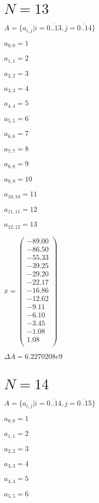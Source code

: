 \documentclass[a4paper,12pt]{article}
\begin{document}
\section{ $N = 13$ }
$A = \{ a _{ i, j } | i = \overline { 0..13 }, j = \overline { 0..14 } \}$

$a _{ 0, 0 } = 1$

$a _{ 1, 1 } = 2$

$a _{ 2, 2 } = 3$

$a _{ 3, 3 } = 4$

$a _{ 4, 4 } = 5$

$a _{ 5, 5 } = 6$

$a _{ 6, 6 } = 7$

$a _{ 7, 7 } = 8$

$a _{ 8, 8 } = 9$

$a _{ 9, 9 } = 10$

$a _{ 10, 10 } = 11$

$a _{ 11, 11 } = 12$

$a _{ 12, 12 } = 13$

$\bar { x } = \begin{pmatrix}
-89.00 \\
-86.50 \\
-55.33 \\
-39.25 \\
-29.20 \\
-22.17 \\
-16.86 \\
-12.62 \\
-9.11 \\
-6.10 \\
-3.45 \\
-1.08 \\
1.08 \\
\end{pmatrix}
$

$\Delta A = 6.2270208e9$



\section{ $N = 14$ }
$A = \{ a _{ i, j } | i = \overline { 0..14 }, j = \overline { 0..15 } \}$

$a _{ 0, 0 } = 1$

$a _{ 1, 1 } = 2$

$a _{ 2, 2 } = 3$

$a _{ 3, 3 } = 4$

$a _{ 4, 4 } = 5$

$a _{ 5, 5 } = 6$
\end{document}
